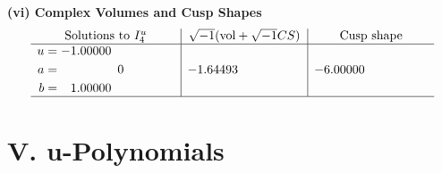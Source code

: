 \documentclass[1p]{elsarticle_modified}
\theoremstyle{definition}
\newcommand{\I}{\sqrt{-1}}
\begin{document}
\newpage\flushleft \textbf{(vi) Complex Volumes and Cusp Shapes}
$$\begin{array}{c|c|c}  
\text{Solutions to }I^u_{4}& \I (\text{vol} + \sqrt{-1}CS) & \text{Cusp shape}\\
 \hline 
\begin{aligned}
u &= -1.00000\phantom{ +0.000000I} \\
a &= \phantom{-0.000000 } 0 \\
b &= \phantom{-}1.00000\phantom{ +0.000000I}\end{aligned}
 & -1.64493\phantom{ +0.000000I} & -6.00000\phantom{ +0.000000I}\\
 \hline 
 \end{array}$$\newpage
\newpage\renewcommand{\arraystretch}{1}
\centering \section*{ V. u-Polynomials}
\end{document}
